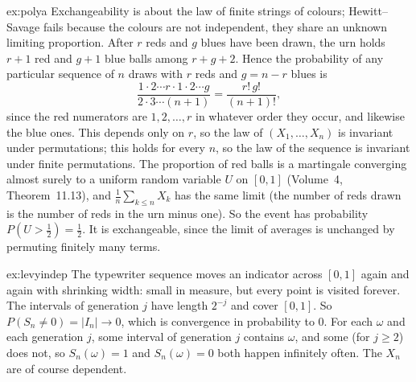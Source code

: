 \begin{solution}{ex:polya}
\idea Exchangeability is about the law of finite strings of colours; Hewitt--Savage fails because the colours are not independent, they
share an unknown limiting proportion.
\writeup After $r$ reds and $g$ blues have been drawn, the urn holds $r+1$ red and $g+1$ blue balls among $r+g+2$. Hence the probability of any
particular sequence of $n$ draws with $r$ reds and $g=n-r$ blues is
\[
\frac{1\cdot2\cdots r\cdot1\cdot2\cdots g}{2\cdot3\cdots(n+1)}=\frac{r!\,g!}{(n+1)!},
\]
since the red numerators are $1,2,\dots,r$ in whatever order they occur, and likewise the blue ones. This depends only on $r$, so the law
of $(X_1,\dots,X_n)$ is invariant under permutations; this holds for every $n$, so the law of the sequence is invariant under finite
permutations. The proportion of red balls is a martingale converging almost surely to a uniform random variable $U$ on $[0,1]$ (Volume~4,
Theorem~11.13), and $\frac1n\sum_{k\le n}X_k$ has the same limit (the number of reds drawn is the number of reds in the urn minus one). So
the event has probability $P(U>\frac12)=\frac12$. It is exchangeable, since the limit of averages is unchanged by permuting finitely many
terms.
\end{solution}

\begin{solution}{ex:levyindep}
\idea The typewriter sequence moves an indicator across $[0,1]$ again and again with shrinking width: small in measure, but every point is
visited forever.
\writeup The intervals of generation $j$ have length $2^{-j}$ and cover $[0,1]$. So $P(S_n\ne0)=|I_n|\to0$, which is convergence in
probability to $0$. For each $\omega$ and each generation $j$, some interval of generation $j$ contains $\omega$, and some (for $j\ge2$)
does not, so $S_n(\omega)=1$ and $S_n(\omega)=0$ both happen infinitely often. The $X_n$ are of course dependent.
\end{solution}

